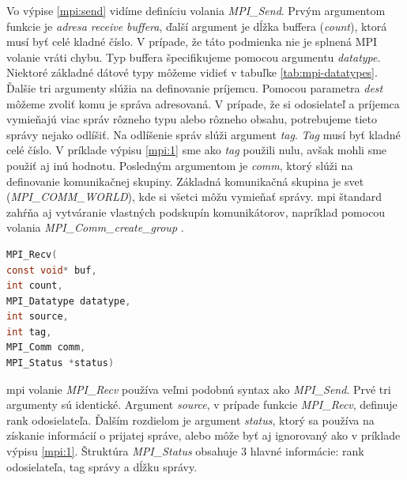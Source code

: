 Vo výpise \ref{mpi:send} vidíme definíciu volania \textit{MPI\_Send}. Prvým argumentom funkcie je \textit{adresa receive buffera},
ďalší argument je dĺžka buffera (\textit{count}), ktorá musí byť celé kladné číslo.
V prípade, že táto podmienka nie je splnená MPI volanie vráti chybu. Typ buffera špecifikujeme pomocou argumentu \textit{datatype}.
Niektoré základné dátové typy môžeme vidieť v tabuľke \ref{tab:mpi-datatypes}.
Ďalšie tri argumenty slúžia na definovanie príjemcu. Pomocou parametra \textit{dest} môžeme zvoliť komu je správa adresovaná.
V prípade, že si odosielateľ a príjemca vymieňajú viac správ rôzneho typu alebo rôzneho obsahu, potrebujeme tieto správy nejako odlíšiť.
Na odlíšenie správ slúži argument \textit{tag}. \textit{Tag} musí byť kladné celé číslo. V príklade výpisu \ref{mpi:1} sme ako \textit{tag} použili nulu,
avšak mohli sme použiť aj inú hodnotu. Posledným argumentom je \textit{comm}, ktorý slúži na definovanie komunikačnej skupiny.
Základná komunikačná skupina je svet (\textit{MPI\_COMM\_WORLD}), kde si všetci môžu vymieňať správy.
\acrshort{mpi} štandard zahŕňa aj vytváranie vlastných podskupín komunikátorov, napríklad pomocou volania \textit{MPI\_Comm\_create\_group} \cite{mpi3-1}.

\begin{lstlisting}[language=c, caption={MPI\_Recv}, label={mpi:recv}]
MPI_Recv(
const void* buf,
int count,
MPI_Datatype datatype,
int source,
int tag,
MPI_Comm comm,
MPI_Status *status)
\end{lstlisting}

\acrshort{mpi} volanie \textit{MPI\_Recv} používa veľmi podobnú syntax ako \textit{MPI\_Send}. Prvé tri argumenty sú identické.
Argument \textit{source}, v prípade funkcie \textit{MPI\_Recv}, definuje rank odosielateľa. Ďalším rozdielom je argument \textit{status},
ktorý sa používa na získanie informácií o prijatej správe, alebo môže byť aj ignorovaný ako v príklade výpisu \ref{mpi:1}.
Štruktúra \textit{MPI\_Status} obsahuje 3 hlavné informácie: rank odosielateľa, tag správy a dĺžku správy.

